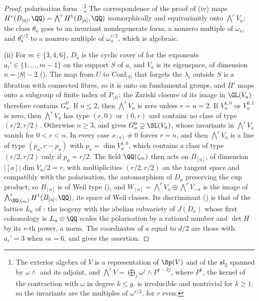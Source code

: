 \begin{proof}
polarisation form \cite[Theorem~17.5]{FH91}.%
\footnote{The exterior algebra of $V$ is a representation of $\Sp(V)$
and of the $\mathfrak{sl}_{2}$ spanned by $\omega\wedge{}$ and its adjoint,
and $\bigwedge^{r}V=\bigoplus_{j}\omega^{j}\wedge P^{r-2j}$, where $P^{k}$, the
kernel of the contraction with $\omega$ in degree $k\le g$, is irreducible
and nontrivial for $k\ge1$, so the invariants are the multiples of
$\omega^{r/2}$, for $r$ even.} The correspondence of the proof of
(iv) maps $H^{r}(B_{[a]},\QQ)=\bigwedge^{r}H^{1}(B_{[a]},
\QQ)$ isomorphically and equivariantly onto $\bigwedge^{r}V_{a}$; the class
$\theta_{a}$ goes to an invariant nondegenerate form, a nonzero multiple of
$\omega_{a}$, and $\theta_{a}^{r/2}$ to a nonzero multiple of
$\omega_{a}^{r/2}$, which is algebraic.

(ii) For $m\in\{3,4,6\}$, $D_{a}$ is the cyclic cover of 
for the exponents $a_{i}'\in\{1,\dots,m-1\}$ on the support $S$ of $a$, and
$V_{a}$ is its eigenspace, of dimension $n=|S|-2$ (). The
map from $U$ to $\mathrm{Conf}_{|S|}$ that forgets the $\lambda_{i}$ outside
$S$ is a fibration with connected fibres, so it is onto on fundamental groups,
and $\Pi'$ maps onto a subgroup of finite index of $P_{|S|}$; the Zariski
closure of its image in $\GL(V_{a})$ therefore contains $G_{a}^{0}$. If
$n\le2$, then $\bigwedge^{r}V_{a}$ is zero unless $r=n=2$. If $V_{a}^{1,0}$ or
$V_{a}^{0,1}$ is zero, then $\bigwedge^{r}V_{a}$ has type $(r,0)$ or $(0,r)$
and contains no class of type $(r/2,r/2)$. Otherwise $n\ge3$, and
 gives $G_{a}^{0}\supseteq\SL(V_{a})$, whose
invariants in $\bigwedge^{r}V_{a}$ vanish for $0<r<n$. In every case
$x_{[a]}\ne0$ forces $r=n$, and then $\bigwedge^{r}V_{a}$ is a line of type
$(p_{a},r-p_{a})$ with $p_{a}=\dim V_{a}^{1,0}$, which contains a class of type
$(r/2,r/2)$ only if $p_{a}=r/2$. The field $\QQ(\zeta_{m})$ then acts on
$B_{[a]}$, of dimension $|[a]|\dim V_{a}/2=r$, with multiplicities
$(r/2,r/2)$ on the tangent space and compatibly with the polarisation, the
automorphism of $D_{a}$ preserving the cup product; so $B_{[a]}$ is of Weil
type (\cite[Definition~3.1]{paperI}), and
$W_{[a]}=\bigwedge^{r}V_{a}\oplus\bigwedge^{r}V_{-a}$ is the image of
$\bigwedge^{r}_{\QQ(\zeta_{m})}H^{1}(B_{[a]},\QQ)$, its space of Weil classes.
Its discriminant (\cite[Definition~15.22]{paperI}) is that of the lattice $L_{a}$ of
: the isogeny with the abelian subvariety of $J(D_{a})$
whose first cohomology is $L_{a}\otimes\QQ$ scales the polarisation by a
rational number and $\det H$ by its $r$-th power, a norm. The coordinates of
$a$ equal to $d/2$ are those with $a_{i}'=3$ when $m=6$, and
 gives the assertion.


\end{proof}
